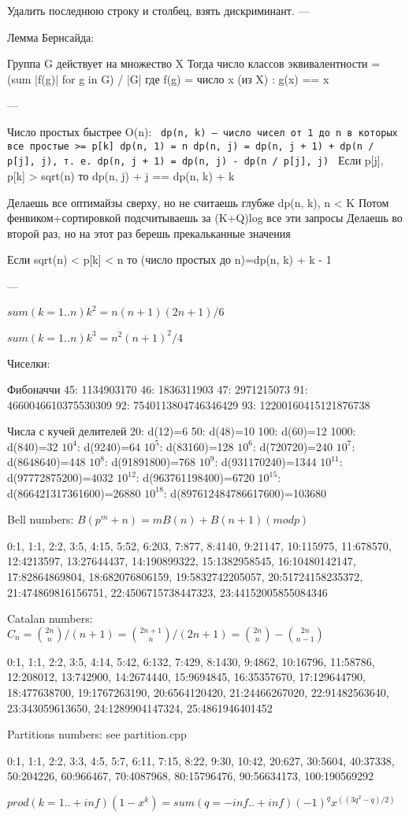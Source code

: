 	Удалить последнюю строку и столбец, взять дискриминант.
---

Лемма Бернсайда:

Группа G действует на множество X
Тогда число классов эквивалентности = (sum |f(g)| for g in G) / |G|
где f(g) = число x (из X) : g(x) == x

---

Число простых быстрее O(n): 
\texttt{
dp(n, k) -- число чисел от 1 до n в которых все простые >= p[k]
dp(n, 1) = n
dp(n, j) = dp(n, j + 1) + dp(n / p[j], j), т. е. 
dp(n, j + 1) = dp(n, j) - dp(n / p[j], j)
}
Если p[j], p[k] > sqrt(n) то dp(n, j) + j == dp(n, k) + k

Делаешь все оптимайзы сверху, но не считаешь глубже dp(n, k), n < K
Потом фенвиком+сортировкой подсчитываешь за (K+Q)log все эти запросы
Делаешь во второй раз, но на этот раз берешь прекальканные значения

Если sqrt(n) < p[k] < n то (число простых до n)=dp(n, k) + k - 1

---

$sum(k=1..n) k^2 = n(n+1)(2n+1)/6$

$sum(k=1..n) k^3 = n^2(n+1)^2/4$


Чиселки: 

Фибоначчи
45:  1134903170
46:  1836311903
47:  2971215073
91:  4660046610375530309
92:  7540113804746346429
93:  12200160415121876738

Числа с кучей делителей
20: d(12)=6
50: d(48)=10
100: d(60)=12
1000: d(840)=32
$10^4$: d(9240)=64
$10^5$: d(83160)=128
$10^6$: d(720720)=240
$10^7$: d(8648640)=448
$10^8$: d(91891800)=768
$10^9$: d(931170240)=1344
$10^{11}$: d(97772875200)=4032
$10^{12}$: d(963761198400)=6720
$10^{15}$: d(866421317361600)=26880
$10^{18}$: d(897612484786617600)=103680

Bell numbers:
$B(p^m + n) = mB(n) + B(n + 1) (mod p)$

0:1, 1:1, 2:2, 3:5, 4:15, 5:52, 6:203, 7:877, 8:4140, 9:21147,
10:115975, 11:678570, 12:4213597, 13:27644437, 14:190899322,
15:1382958545, 16:10480142147, 17:82864869804, 18:682076806159,
19:5832742205057, 20:51724158235372, 21:474869816156751,
22:4506715738447323, 23:44152005855084346

Catalan numbers:
$C_n = \binom{2n}{n} / (n + 1) = \binom{2n + 1}{n} / (2n + 1) = \binom{2n}{n} - \binom{2n}{n - 1}$

0:1, 1:1, 2:2, 3:5, 4:14, 5:42, 6:132, 7:429, 8:1430, 9:4862,
10:16796, 11:58786, 12:208012, 13:742900, 14:2674440,
15:9694845, 16:35357670, 17:129644790, 18:477638700,
19:1767263190, 20:6564120420, 21:24466267020, 22:91482563640,
23:343059613650, 24:1289904147324, 25:4861946401452

Partitions numbers:
see partition.cpp

0:1, 1:1, 2:2, 3:3, 4:5, 5:7, 6:11, 7:15, 8:22, 9:30, 10:42, 20:627, 30:5604, 40:37338, 50:204226, 60:966467, 70:4087968, 80:15796476, 90:56634173, 100:190569292

$prod (k=1..+inf) (1-x^k) = sum(q=-inf..+inf) (-1)^q x^((3q^2-q)/2)$